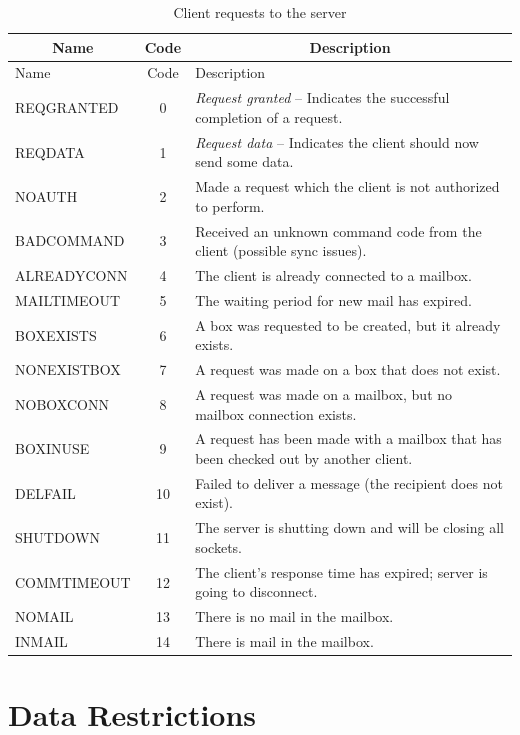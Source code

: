 \documentclass[10pt]{report}
\begin{document}
\begin{table}[h]
	\centering
	\caption{Client requests to the server}
	\begin{tabular}{|l|c|p{12cm}|}
		\hline\multicolumn{1}{|c|}{\bfseries Name} & \multicolumn{1}{|c|}{\bfseries Code} & \multicolumn{1}{|c|}{\bfseries Description} \\ \hline
		Name & Code & Description\\ \hline
		REQGRANTED & 0 & \emph{Request granted} -- Indicates the successful completion of a request.\\ \hline
		REQDATA & 1 & \emph{Request data} -- Indicates the client should now send some data.\\ \hline
		NOAUTH & 2 & Made a request which the client is not authorized to perform.\\ \hline
		BADCOMMAND & 3 & Received an unknown command code from the client (possible sync issues).\\ \hline
		ALREADYCONN & 4 & The client is already connected to a mailbox.\\ \hline
		MAILTIMEOUT & 5 & The waiting period for new mail has expired.\\ \hline
		BOXEXISTS & 6 & A box was requested to be created, but it already exists.\\ \hline
		NONEXISTBOX & 7 & A request was made on a box that does not exist.\\ \hline
		NOBOXCONN & 8 & A request was made on a mailbox, but no mailbox connection exists.\\ \hline
		BOXINUSE & 9 & A request has been made with a mailbox that has been checked out by another client.\\ \hline
		DELFAIL & 10 & Failed to deliver a message (the recipient does not exist).\\ \hline
		SHUTDOWN & 11 & The server is shutting down and will be closing all sockets.\\ \hline
		COMMTIMEOUT & 12 & The client's response time has expired; server is going to disconnect.\\ \hline
		NOMAIL & 13 & There is no mail in the mailbox.\\ \hline
		INMAIL & 14 & There is mail in the mailbox.\\ \hline
	\end{tabular}
	\label{fig:resp_table}
\end{table}

\section{Data Restrictions}
\end{document}
